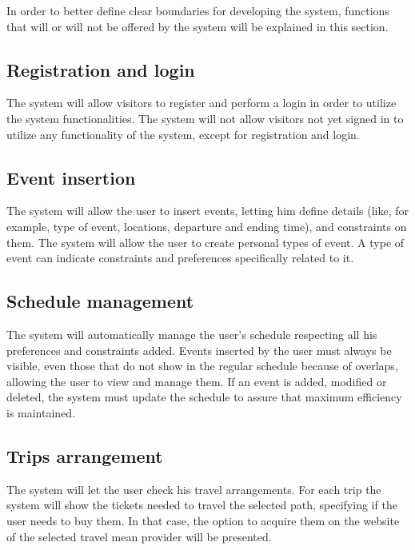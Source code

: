 In order to better define clear boundaries for developing the system, functions that  will or will not be offered by the system will be explained in this section.

\subsection{Registration and login}
The system will allow visitors to register and perform a login in order to utilize the system functionalities. 
\newline
The system will not allow visitors not yet signed in to utilize any functionality of the system, except for registration and login.

\subsection{Event insertion}
The system will allow the user to insert events, letting him define details (like, for example, type of event, locations, departure and ending time), and constraints on them.
\newline
The system will allow the user to create personal types of event.
A type of event can indicate constraints and preferences specifically related to it.

\subsection{Schedule management}
The system will automatically manage the user's schedule respecting all his preferences and constraints added.
\newline
Events inserted by the user must always be visible, even those that do not show in the regular schedule because of overlaps, allowing the user to view and manage them.
\newline
If an event is added, modified or deleted, the system must update the schedule to assure that maximum efficiency is maintained.

\subsection{Trips arrangement}
The system will let the user check his travel arrangements.
\newline
For each trip the system will show the tickets needed to travel the selected path, specifying if the user needs to buy them. In that case, the option to acquire them on the website of the selected travel mean provider will be presented.

